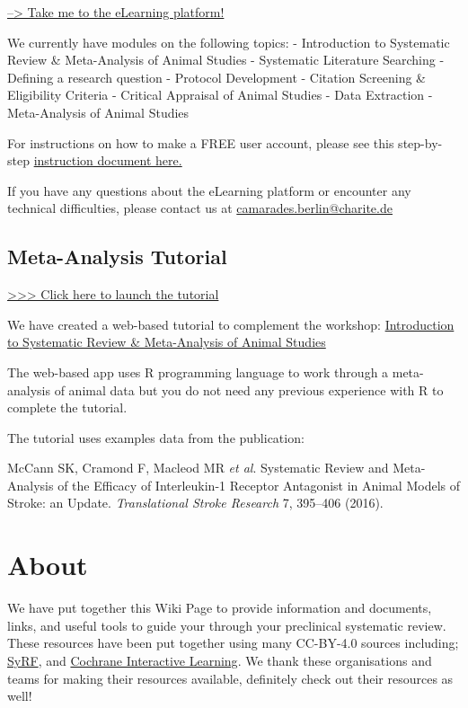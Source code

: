 \documentclass[
]{book}
\begin{document}
\href{https://courses.bihealth.org}{--\textgreater{} Take me to the eLearning platform!}

We currently have modules on the following topics:
- Introduction to Systematic Review \& Meta-Analysis of Animal Studies
- Systematic Literature Searching
- Defining a research question
- Protocol Development
- Citation Screening \& Eligibility Criteria
- Critical Appraisal of Animal Studies
- Data Extraction
- Meta-Analysis of Animal Studies

For instructions on how to make a FREE user account, please see this step-by-step \href{eLearning_course_account_guide.pdf}{instruction document here.}

If you have any questions about the eLearning platform or encounter any technical difficulties, please contact us at \href{mailto:CAMARADES.berlin@charite.de}{camarades.berlin@charite.de}

\section{Meta-Analysis Tutorial}\label{meta-analysis-tutorial}

\href{https://camarades.shinyapps.io/R-MA-Tutorial/}{\textgreater\textgreater\textgreater{} Click here to launch the tutorial}

We have created a web-based tutorial to complement the workshop: \href{https://www.bihealth.org/en/translation/innovation-enabler/quest-center/events/course/introduction-to-systematic-review-meta-analysis-of-animal-studies}{Introduction to Systematic Review \& Meta-Analysis of Animal Studies}

The web-based app uses R programming language to work through a meta-analysis of animal data but you do not need any previous experience with R to complete the tutorial.

The tutorial uses examples data from the publication:

McCann SK, Cramond F, Macleod MR \emph{et al}. Systematic Review and
Meta-Analysis of the Efficacy of Interleukin-1 Receptor Antagonist in
Animal Models of Stroke: an Update. \emph{Translational Stroke Research} 7, 395--406 (2016).

\chapter{About}\label{about}

We have put together this Wiki Page to provide information and documents, links, and useful tools to guide your through your preclinical systematic review. These resources have been put together using many CC-BY-4.0 sources including; \href{https://syrf.org.uk/}{SyRF}, and \href{https://training.cochrane.org/interactivelearning}{Cochrane Interactive Learning}. We thank these organisations and teams for making their resources available, definitely check out their resources as well!
\end{document}
